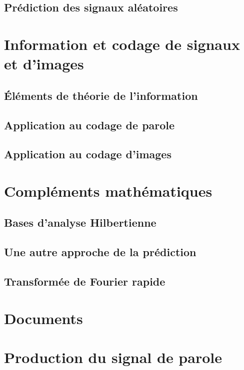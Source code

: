 \documentclass[graybox,envcountchap,envcountsame,sectrefs]{svmono}
\begin{document}
\chapter{Pr\'ediction des signaux al\'eatoires}
\label{chap:Prediction}

\part{Information et codage de signaux et d'images}
\chapter{\'El\'ements de th\'eorie de l'information}
\label{info-chap}

\chapter{Application au codage de parole}


\chapter{Application au codage d'images}


\appendix
\part{Compl\'ements math\'ematiques}
\chapter{Bases d'analyse Hilbertienne}

\chapter{Une autre approche de la prédiction}

\chapter{Transformée de Fourier rapide}

\part{Documents}
\part{Production du signal de parole}

\end{document}
